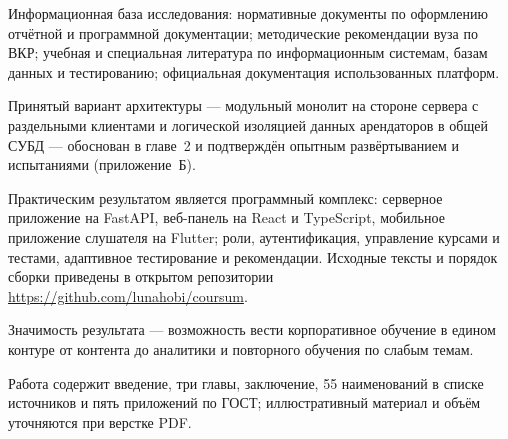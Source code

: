 Информационная база исследования: нормативные документы по оформлению отчётной и программной документации\cite{gost7322017,gost712003,gost21052019,gost3460190,gost250102015,gost509222006,gost1920178,gost1930179,fz152}; методические рекомендации вуза по ВКР\cite{metodichka_vkr_ikt_2021}; учебная и специальная литература по информационным системам, базам данных и тестированию\cite{fowler_patterns_ru,date_intro_db_ru,sommerville2019software,makkakov_allfusion,kaner_testing_en,van_der_linden1997,wainer2000,lord1980}; официальная документация использованных платформ\cite{fastapi_docs,postgresql_docs,flutter_docs,pydantic_docs,sqlalchemy_docs}.

Принятый вариант архитектуры --- модульный монолит на стороне сервера с раздельными клиентами и логической изоляцией данных арендаторов в общей СУБД --- обоснован в главе~2 и подтверждён опытным развёртыванием и испытаниями (приложение~Б).

Практическим результатом является программный комплекс: серверное приложение на FastAPI, веб-панель на React и TypeScript, мобильное приложение слушателя на Flutter; роли, аутентификация, управление курсами и тестами, адаптивное тестирование и рекомендации. Исходные тексты и порядок сборки приведены в открытом репозитории \url{https://github.com/lunahobi/coursum}.

Значимость результата --- возможность вести корпоративное обучение в едином контуре от контента до аналитики и повторного обучения по слабым темам.

Работа содержит введение, три главы, заключение, 55 наименований в списке источников и пять приложений по ГОСТ\cite{metodichka_vkr_ikt_2021,gost7052008}; иллюстративный материал и объём уточняются при верстке PDF.
